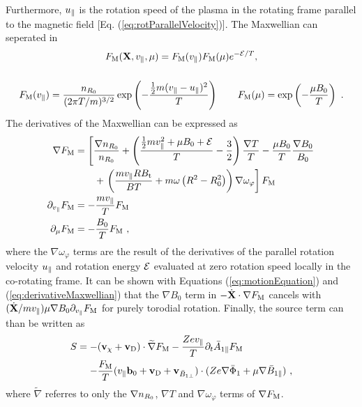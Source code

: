 Furthermore, $u_\parallel$ is the rotation speed of the plasma in the rotating frame parallel to the magnetic field [Eq. (\ref{eq:rotParallelVelocity})]. The Maxwellian can seperated in 
\begin{gather}
	F_\mathrm{M}(\boldsymbol{\mathbf{X}}, v_\parallel, \mu) = F_\mathrm{M}(v_\parallel) F_\mathrm{M}(\mu) e^{-\mathcal{E}/T} , \\[0,5cm]
	F_\mathrm{M}(v_\parallel) = \frac{n_{R_0}}{(2\pi T/m)^{3/2}} \exp\left(-\frac{\frac{1}{2} m (v_\parallel - u_\parallel)^2}{T}\right) \qquad F_\mathrm{M}(\mu) = \exp\left(-\frac{\mu B_0}{T}\right) ~.
	\label{eq:maxwellianSeperated}
\end{gather}
The derivatives of the Maxwellian can be expressed as 
\begin{gather}
	\begin{aligned}
		\nabla F_\mathrm{M}           &= \left[\frac{\nabla n_{R_0}}{n_{R_0}} + \left(\frac{\frac{1}{2} m v_\parallel^2 + \mu B_0 + \mathcal{E}}{T} - \frac{3}{2}\right)\frac{\nabla T}{T} - \frac{\mu B_0}{T} \frac{\nabla B_0}{B_0} \right. \\ 
		&\qquad + \left. \left(\frac{m v_\parallel R B_\mathrm{t}}{BT} + m\omega \left(R^2 - R_0^2\right)\right) \nabla \omega_\varphi\right] F_\mathrm{M} \\
		\partial_{v_\parallel} F_\mathrm{M} &= - \frac{m v_\parallel}{T} F_\mathrm{M} \\
		\partial_\mu F_\mathrm{M}     &= - \frac{B_0}{T} F_\mathrm{M} ~,  
	\end{aligned}
	\label{eq:derivativeMaxwellian}
\end{gather} 
where the $\nabla \omega_\varphi$ terms are the result of the derivatives of the parallel rotation velocity $u_\parallel$ and rotation energy $\mathcal{E}$ evaluated at zero rotation speed locally in the co-rotating frame. \cite{Peeters2009B} It can be shown with Equations (\ref{eq:motionEquation}) and (\ref{eq:derivativeMaxwellian}) that the $\nabla B_0$ term in $-\dot{\boldsymbol{\mathbf{X}}}\cdot \nabla F_\mathrm{M}$ cancels with $(\dot{\boldsymbol{\mathbf{X}}}/m v_\parallel) \mu \nabla B_0 \partial_{v_\parallel} F_\mathrm{M}$ for purely torodial rotation. Finally, the source term can than be written as 
\begin{gather}
	\begin{aligned}
		S = -& (\boldsymbol{\mathbf{v}}_\chi + \boldsymbol{\mathbf{v}}_\mathrm{D}) \cdot \widetilde{\nabla} F_\mathrm{M} - \frac{Z e v_\parallel}{T} \partial_t \bar{A}_{1\parallel} F_\mathrm{M} \\
		    -& \frac{F_\mathrm{M}}{T} (v_\parallel \boldsymbol{\mathbf{b}}_0 + \boldsymbol{\mathbf{v}}_\mathrm{D} + \boldsymbol{\mathbf{v}}_{\bar{B}_{1\perp}}) \cdot (Z e \nabla \bar{\Phi}_1 + \mu \nabla \bar{B}_{1\parallel})~,
	\end{aligned}
	\label{eq:sourceTerm}
\end{gather}
where $\widetilde{\nabla}$ referres to only the $\nabla n_{R_0}$, $\nabla T$ and $\nabla \omega_\varphi$ terms of $\nabla F_\mathrm{M}$. \bigskip

